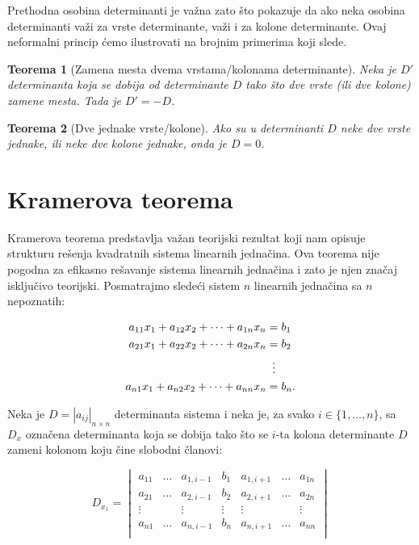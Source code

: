 \documentclass[11pt]{article}
\theoremstyle{masulthm}
\newtheorem{theorem}{Teorema}[section]
\theoremstyle{masuldef}
\theoremstyle{masulexmp}
\begin{document}
Prethodna osobina determinanti je važna zato što pokazuje da ako neka osobina determinanti važi za vrste
determinante, važi i za kolone determinante. Ovaj neformalni princip ćemo ilustrovati na brojnim primerima koji slede.

\begin{theorem}[Zamena mesta dvema vrstama/kolonama determinante]
Neka je $ D' $ determinanta koja se dobija od determinante $ D $ tako što dve vrste (ili dve kolone)
zamene mesta. Tada je $ D' = -D $.
\end{theorem}

\begin{theorem}[Dve jednake vrste/kolone]
Ako su u determinanti $ D $ neke dve vrste jednake, ili neke dve kolone jednake, onda je $ D = 0 $.
\end{theorem}



\section{Kramerova teorema}

Kramerova teorema predstavlja važan teorijski rezultat koji nam opisuje strukturu rešenja
kvadratnih sistema linearnih jednačina. Ova teorema nije pogodna za efikasno rešavanje sistema
linearnih jednačina i zato je njen značaj isključivo teorijski.
Posmatrajmo sledeći sistem $ n $ linearnih jednačina sa $ n $ nepoznatih:

\begin{align*}
    a_{11} x_1 + a_{12} x_2 + \dots + a_{1n} x_n & = b_1  \\
    a_{21} x_1 + a_{22} x_2 + \dots + a_{2n} x_n & = b_2  \\
    & \mathrel{
        \settowidth{\dimen0}{$=$}
        \hbox to \dimen0{\hss$\vdots$\hss}
    } \\
    a_{n1} x_1 + a_{n2} x_2 + \dots + a_{nn} x_n & = b_n.  \\
\end{align*}

\noindent
Neka je $ D = |a_{ij}|_{n \times n} $ determinanta sistema i neka je, za svako $ i \in \{1, \dots, n\}$,
sa $ D_x $ označena determinanta koja se dobija tako što se $ i $-ta kolona
determinante $ D $ zameni kolonom koju čine slobodni članovi:

\begin{equation*}
    D_{x_1} =
    \begin{vmatrix}
        a_{11} & \dots & a_{1,i-1} & b_1 & a_{1,i+1} & \dots & a_{1n} \\
        a_{21} & \dots & a_{2,i-1} & b_2 & a_{2,i+1} & \dots & a_{2n} \\
        \vdots &       & \vdots    & \vdots & \vdots &       & \vdots \\
        a_{n1} & \dots & a_{n,i-1} & b_n & a_{n,i+1} & \dots & a_{nn} \\
    \end{vmatrix}
\end{equation*}
\end{document}
